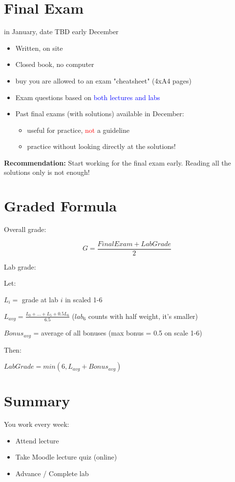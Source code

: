\documentclass[11pt]{article}
\begin{document}
\section*{Final Exam}
in January, date TBD early December
\begin{itemize}
	\item Written, on site
	\item Closed book, no computer
	\item buy you are allowed to an exam "cheatsheet" (4xA4 pages)
	\item Exam questions based on \textcolor{blue}{both lectures and labs} 
	\item Past final exams (with solutions) available in December:
	\begin{itemize}
		\item useful for practice, \textcolor{red}{not} a guideline
		\item practice without looking directly at the solutions!
	\end{itemize}
\end{itemize}

\textbf{Recommendation:} Start working for the final exam early. Reading all the solutions only is not enough!

\section*{Graded Formula}

Overall grade: 

$$
G = \frac{FinalExam + LabGrade}{2}
$$

Lab grade:

Let: 

$ L_{i} = $ grade at lab $i$ in scaled 1-6

$L_{avg} = \frac{L_{0} + ... + L_{5} + 0.5L_{6}}{6.5}$ ($lab_6$ counts with half weight, it's smaller)

$Bonus_{avg}$ = average of all bonuses (max bonus = 0.5 on scale 1-6)

Then: 

$LabGrade = min(6, L_{avg} + Bonus_{avg}) $
\section*{Summary}

You work every week: 
\begin{itemize}
	\item Attend lecture
	\item Take Moodle lecture quiz (online)
	\item Advance / Complete lab
\end{itemize}
\end{document}
